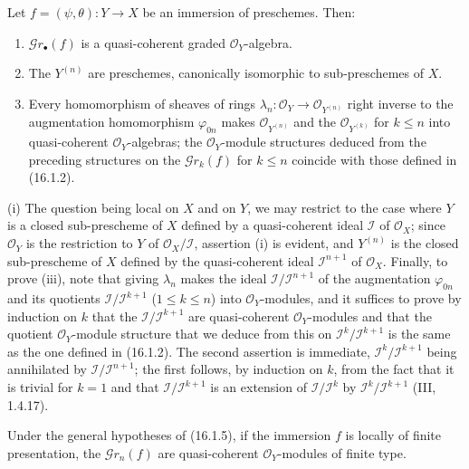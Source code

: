 \begin{proposition}[16.1.5]\label{IV.16.1.5}
Let $f=(\psi,\theta):Y\to X$ be an immersion of preschemes. Then:
\begin{enumerate}
\item[(i)] $\mathscr{G}r_\bullet(f)$ is a quasi-coherent graded
$\mathcal{O}_Y$-algebra.
\item[(ii)] The $Y^{(n)}$ are preschemes, canonically isomorphic to
sub-preschemes of $X$.
\item[(iii)] Every homomorphism of sheaves of rings
$\lambda_n:\mathcal{O}_Y\to\mathcal{O}_{Y^{(n)}}$ right inverse to
the augmentation homomorphism $\varphi_{0n}$ makes
$\mathcal{O}_{Y^{(n)}}$ and the $\mathcal{O}_{Y^{(k)}}$ for $k\leq n$ into
quasi-coherent $\mathcal{O}_Y$-algebras; the
$\mathcal{O}_Y$-module structures deduced from the preceding structures on the
$\mathscr{G}r_k(f)$ for $k\leq n$ coincide with those defined in
(16.1.2).
\end{enumerate}
\end{proposition}

\noindent(i) The question being local on $X$ and on $Y$, we may restrict to the case
where $Y$ is a closed sub-prescheme of $X$ defined by a quasi-coherent ideal
$\mathscr{I}$ of $\mathcal{O}_X$; since $\mathcal{O}_Y$ is the restriction to
$Y$ of $\mathcal{O}_X/\mathscr{I}$, assertion (i) is evident, and $Y^{(n)}$
is the closed sub-prescheme of $X$ defined by the quasi-coherent ideal
$\mathscr{I}^{n+1}$ of $\mathcal{O}_X$. Finally, to prove (iii), note that
giving $\lambda_n$ makes the ideal
$\mathscr{I}/\mathscr{I}^{n+1}$ of the augmentation $\varphi_{0n}$ and its
quotients $\mathscr{I}/\mathscr{I}^{k+1}$ ($1\leq k\leq n$) into
$\mathcal{O}_Y$-modules, and it suffices to prove by induction on $k$ that the
$\mathscr{I}/\mathscr{I}^{k+1}$ are quasi-coherent $\mathcal{O}_Y$-modules
and that the quotient $\mathcal{O}_Y$-module structure that we
deduce from this on $\mathscr{I}^k/\mathscr{I}^{k+1}$ is the same as the one defined in
(16.1.2). The second assertion is immediate,
$\mathscr{I}^k/\mathscr{I}^{k+1}$ being annihilated by
$\mathscr{I}/\mathscr{I}^{n+1}$; the first follows, by induction on $k$,
from the fact that it is trivial for $k=1$ and that
$\mathscr{I}/\mathscr{I}^{k+1}$ is an extension of
$\mathscr{I}/\mathscr{I}^k$ by
$\mathscr{I}^k/\mathscr{I}^{k+1}$ (III, 1.4.17).

\begin{corollary}[16.1.6]
\label{IV.16.1.6}
Under the general hypotheses of (16.1.5), if the immersion $f$ is locally of
finite presentation, the $\mathscr{G}r_n(f)$ are quasi-coherent
$\mathcal{O}_Y$-modules of finite type.
\end{corollary}

